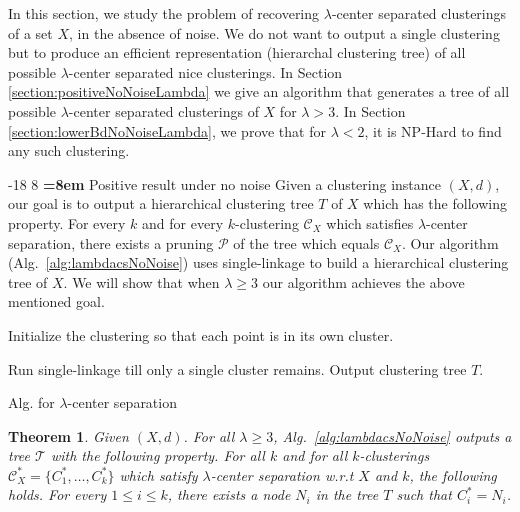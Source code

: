 \documentclass[12pt]{article}
\makeatletter
\newtheorem{theorem}{Theorem}
\newcommand{\mc}{\mathcal}
\renewcommand\subsubsection{\@startsection{subsubsection}{3}{\z@}%
   {-18\p@ \@plus -4\p@ \@minus -4\p@}%
   {8\p@ \@plus 4\p@ \@minus 4\p@}%
   {\normalfont\normalsize\bfseries\boldmath
   \rightskip=\z@ \@plus 8em \pretolerance=10000}}
\makeatother
\begin{document}
In this section, we study the problem of recovering $\lambda$-center separated clusterings of a set $X$, in the absence of noise. We do not want to output a single clustering but to produce an efficient representation (hierarchal clustering tree) of all possible $\lambda$-center separated nice clusterings. In Section \ref{section:positiveNoNoiseLambda} we give an algorithm that generates a tree of all possible $\lambda$-center separated clusterings of $X$ for $\lambda > 3$.  In Section \ref{section:lowerBdNoNoiseLambda}, we prove that for  $\lambda < 2$, it is NP-Hard to find any such clustering.


\subsubsection{Positive result under no noise}
\label{section:positiveNoNoiseLambda}
Given a clustering instance $(X, d)$, our goal is to output a hierarchical clustering tree $T$ of $X$ which has the following property. For every $k$ and for every $k$-clustering $\mc C_{X}$ which satisfies $\lambda$-center separation, there exists a pruning $\mc P$ of the tree which equals $\mc C_{X}$. Our algorithm (Alg.~\ref{alg:lambdacsNoNoise}) uses single-linkage to build a hierarchical clustering tree of $X$. We will show that when $\lambda \ge 3$ our algorithm achieves the above mentioned goal. 

\begin{algorithm}[!t]
	\SetAlgoLined
	\Indp{}
	
	\vspace{2mm} Initialize the clustering so that each point is in its own cluster.
	
	Run single-linkage till only a single cluster remains. Output clustering tree $T$.

\caption{Alg. for $\lambda$-center separation}
\label{alg:lambdacsNoNoise}
\end{algorithm}
\vspace{-.1in}
\begin{theorem}
\label{thm:lambdaNoNoisePositive}
Given $(X , d)$. For all $\lambda \ge 3$, Alg.~\ref{alg:lambdacsNoNoise} outputs a tree $\mc T$ with the following property. For all $k$ and for all $k$-clusterings $\mc C_{X}^* = \{C_1^*, \ldots, C_k^* \}$ which satisfy $\lambda$-center separation w.r.t $X$ and $k$, the following holds. For every $1 \le i \le k$, there exists a node $N_i$ in the tree $T$ such that $C_i^* = N_i$.
\end{theorem}
\end{document}
